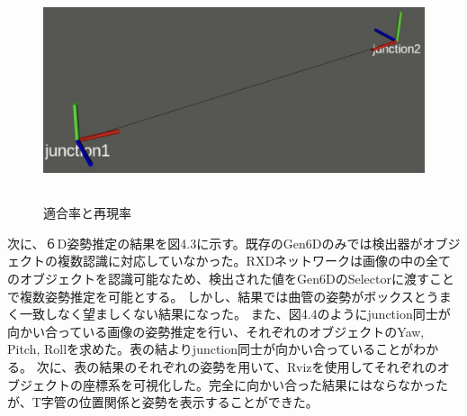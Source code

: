 \begin{figure}[htbt]
	\centering
	 \includegraphics[height=65mm]{rviz.eps}
	 \caption{適合率と再現率}
	 \label{fig:f2}
\end{figure}

次に、６D姿勢推定の結果を図4.3に示す。既存のGen6Dのみでは検出器がオブジェクトの複数認識に対応していなかった。RXDネットワークは画像の中の全てのオブジェクトを認識可能なため、検出された値をGen6DのSelectorに渡すことで複数姿勢推定を可能とする。
しかし、結果では曲管の姿勢がボックスとうまく一致しなく望ましくない結果になった。
また、図4.4のようにjunction同士が向かい合っている画像の姿勢推定を行い、それぞれのオブジェクトのYaw, Pitch, Rollを求めた。表の結よりjunction同士が向かい合っていることがわかる。
次に、表の結果のそれぞれの姿勢を用いて、Rvizを使用してそれぞれのオブジェクトの座標系を可視化した。完全に向かい合った結果にはならなかったが、T字管の位置関係と姿勢を表示することができた。
